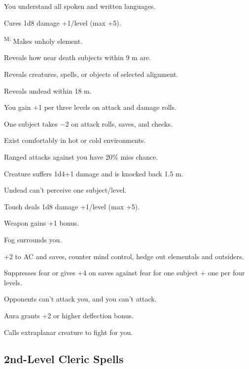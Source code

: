  You understand all spoken and written languages.

 Cures 1d8 damage +1/level (max +5).

\textsuperscript{M:} Makes unholy element. %

 Reveals how near death subjects within 9 m are.

 Reveals creatures, spells, or objects of selected alignment.

 Reveals undead within 18 m.

 You gain +1 per three levels on attack and damage rolls.

 One subject takes $-2$ on attack rolls, saves, and checks.

 Exist comfortably in hot or cold environments.

 Ranged attacks against you have 20\% miss chance.

 Creature suffers 1d4+1 damage and is knocked back 1.5 m. %

 Undead can't perceive one subject/level.

 Touch deals 1d8 damage +1/level (max +5).


 Weapon gains +1 bonus.

 Fog surrounds you.

 +2 to AC and saves, counter mind control, hedge out elementals and outsiders.

 Suppresses fear or gives +4 on saves against fear for one subject + one per four levels.

 Opponents can't attack you, and you can't attack.

 Aura grants +2 or higher deflection bonus.

 Calls extraplanar creature to fight for you.



\subsection{2nd-Level Cleric Spells}

